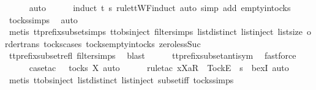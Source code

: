 \begin{isabellebody}
\ \ \ \ \isamarkupfalse%
\ auto\isanewline
\ \ \ \ \isamarkupfalse%
\ {\isacharparenleft}induct\ t\ s\ rule{\isacharcolon}ttWF{}{\isachardot}induct{\isacharcomma}\ auto\ simp\ add{\isacharcolon}\ empty{\isacharunderscore}in{\isacharunderscore}tocks{\isacharparenright}\isanewline
\ \ \ \ \isamarkupfalse%
\ tocks{\isachardot}simps\ \isamarkupfalse%
\ auto\isanewline
\ \ \ \ \isamarkupfalse%
\ {\isacharparenleft}metis\ tt{\isacharunderscore}prefix{\isacharunderscore}subset{\isachardot}simps{\isacharparenleft}{}{\isacharparenright}\ ttobs{\isachardot}inject{\isacharparenleft}{}{\isacharparenright}\ filter{\isachardot}simps{\isacharparenleft}{}{\isacharparenright}\ list{\isachardot}distinct{\isacharparenleft}{}{\isacharparenright}\ list{\isachardot}inject\ list{\isachardot}size{\isacharparenleft}{}{\isacharparenright}\ order{\isacharunderscore}trans\ tocks{\isachardot}cases\ tocks{\isachardot}empty{\isacharunderscore}in{\isacharunderscore}tocks\ zero{\isacharunderscore}less{\isacharunderscore}Suc{\isacharparenright}\isanewline
\ \ \ \ \isamarkupfalse%
\ tt{\isacharunderscore}prefix{\isacharunderscore}subset{\isacharunderscore}refl\ filter{\isachardot}simps{\isacharparenleft}{}{\isacharparenright}\ \isamarkupfalse%
\ blast\isanewline
\ \ \ \ \isamarkupfalse%
\ tt{\isacharunderscore}prefix{\isacharunderscore}subset{\isacharunderscore}antisym\ \isamarkupfalse%
\ fastforce\isanewline
\ \ \ \ \isamarkupfalse%
\ {\isacharparenleft}case{\isacharunderscore}tac\ {\isachardoublequoteopen}{\isasymsigma}\ {\isasymin}\ tocks\ X{\isachardoublequoteclose}{\isacharcomma}\ auto{\isacharparenright}\isanewline
\ \ \ \ \isamarkupfalse%
\ {\isacharparenleft}rule{\isacharunderscore}tac\ x{\isacharequal}{\isachardoublequoteopen}{\isacharbrackleft}Xa{\isacharbrackright}\isactrlsub R\ {\isacharhash}\ {\isacharbrackleft}Tock{\isacharbrackright}\isactrlsub E\ {\isacharhash}\ s{\isacharprime}{\isachardoublequoteclose}\ \ bexI{\isacharcomma}\ auto{\isacharparenright}\isanewline
\ \ \ \ \isamarkupfalse%
\ {\isacharparenleft}metis\ ttobs{\isachardot}inject{\isacharparenleft}{}{\isacharparenright}\ list{\isachardot}distinct{\isacharparenleft}{}{\isacharparenright}\ list{\isachardot}inject\ subset{\isacharunderscore}iff\ tocks{\isachardot}simps{\isacharparenright}\isanewline

\end{isabellebody}
